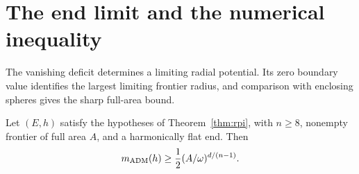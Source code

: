 \section{The end limit and the numerical inequality}
\label{sec:rpi:numerical-limit}

The vanishing deficit determines a limiting radial potential. Its zero
boundary value identifies the largest limiting frontier radius, and
comparison with enclosing spheres gives the sharp full-area bound.

\begin{proposition}
\label{prop:rpi:harmonic-flat-inequality}
Let $(E,h)$ satisfy the hypotheses of Theorem~\ref{thm:rpi}, with
$n\ge8$, nonempty frontier of full area $A$, and a harmonically flat
end. Then
\[
 m_{\rm ADM}(h)\ge\frac12(A/\omega)^{d/(n-1)}.
\]
\end{proposition}

